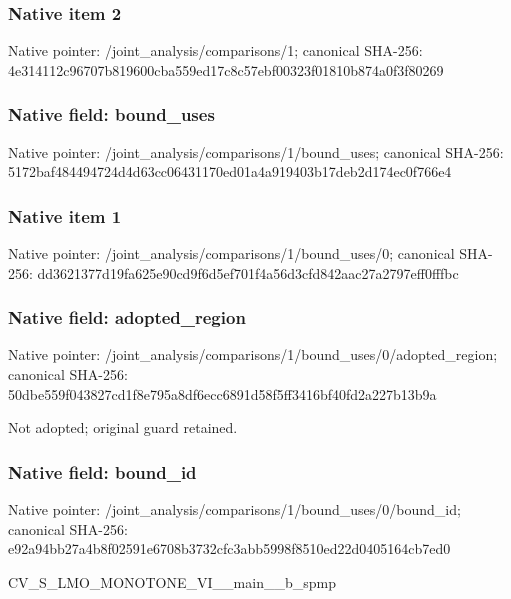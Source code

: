 \documentclass[10pt,a4paper]{article}
\begin{document}
\subsubsection{Native item 2}
Native pointer: /joint\_\allowbreak{}analysis/comparisons/1; canonical SHA-256: 4e314112c96707b819600cba559ed17c8c57ebf00323f01810b874a0f3f80269

\subsubsection{Native field: bound\_\allowbreak{}uses}
Native pointer: /joint\_\allowbreak{}analysis/comparisons/1/bound\_\allowbreak{}uses; canonical SHA-256: 5172baf484494724d4d63cc06431170ed01a4a919403b17deb2d174ec0f766e4

\subsubsection{Native item 1}
Native pointer: /joint\_\allowbreak{}analysis/comparisons/1/bound\_\allowbreak{}uses/0; canonical SHA-256: dd3621377d19fa625e90cd9f6d5ef701f4a56d3cfd842aac27a2797eff0fffbc

\subsubsection{Native field: adopted\_\allowbreak{}region}
Native pointer: /joint\_\allowbreak{}analysis/comparisons/1/bound\_\allowbreak{}uses/0/adopted\_\allowbreak{}region; canonical SHA-256: 50dbe559f043827cd1f8e795a8df6ecc6891d58f5ff3416bf40fd2a227b13b9a

\begingroup\raggedright\sloppy Not adopted;\allowbreak{} original guard retained.\par\endgroup

\subsubsection{Native field: bound\_\allowbreak{}id}
Native pointer: /joint\_\allowbreak{}analysis/comparisons/1/bound\_\allowbreak{}uses/0/bound\_\allowbreak{}id; canonical SHA-256: e92a94bb27a4b8f02591e6708b3732cfc3abb5998f8510ed22d0405164cb7ed0

\begingroup\raggedright\sloppy CV\_\allowbreak{}S\_\allowbreak{}LMO\_\allowbreak{}MONOTONE\_\allowbreak{}VI\_\allowbreak{}\_\allowbreak{}main\_\allowbreak{}\_\allowbreak{}b\_\allowbreak{}spmp\par\endgroup
\end{document}
